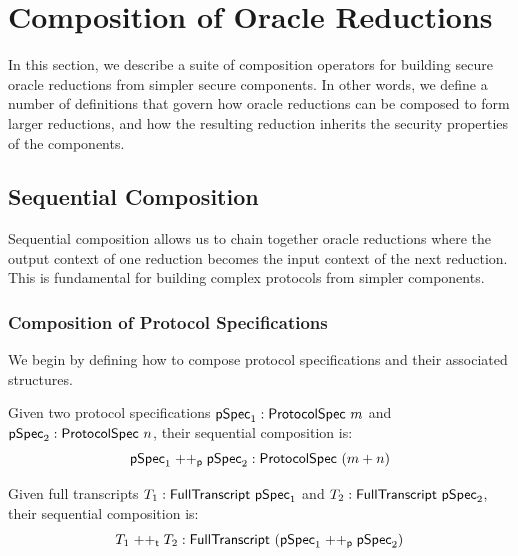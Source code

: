 \section{Composition of Oracle Reductions}\label{sec:composition_oracle_reductions}

In this section, we describe a suite of composition operators for building secure oracle reductions from simpler secure components. In other words, we define a number of definitions that govern how oracle reductions can be composed to form larger reductions, and how the resulting reduction inherits the security properties of the components.


\subsection{Sequential Composition}\label{sec:sequential_composition}

Sequential composition allows us to chain together oracle reductions where the output context of one reduction becomes the input context of the next reduction. This is fundamental for building complex protocols from simpler components.

\subsubsection{Composition of Protocol Specifications}

We begin by defining how to compose protocol specifications and their associated structures.

\begin{definition}
    \label{def:protocol_spec_append}
    Given two protocol specifications $\pSpec_1 : \ProtocolSpec\ m$ and $\pSpec_2 : \ProtocolSpec\ n$, their sequential composition is:
    \[ \mathsf{pSpec}_1 \mathrel{++_\mathsf{p}} \mathsf{pSpec}_2 : \mathsf{ProtocolSpec}\ (m + n) \]
    \leanok
\end{definition}

\begin{definition}
    \label{def:transcript_append}
    Given full transcripts $T_1 : \mathsf{FullTranscript}\ \mathsf{pSpec}_1$ and $T_2 : \mathsf{FullTranscript}\ \mathsf{pSpec}_2$, their sequential composition is:
    \[ T_1 \mathrel{++_\mathsf{t}} T_2 : \mathsf{FullTranscript}\ (\mathsf{pSpec}_1 \mathrel{++_\mathsf{p}} \mathsf{pSpec}_2) \]
    \leanok
\end{definition}

